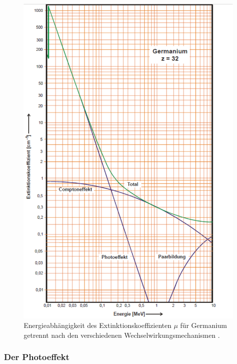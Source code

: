 \begin{figure}
	\centering
	\includegraphics[width=\linewidth-70pt,height=\textheight-70pt,keepaspectratio]{content/images/sigma.pdf}
	\caption{Energieabhängigkeit des Extinktionskoeffizienten $\mu$ für Germanium getrennt nach den verschiedenen Wechselwirkungsmechanismen \cite{V18}.}
	\label{fig:Wirkungsquerschnitt}
\end{figure}

\subsubsection{Der Photoeffekt}

